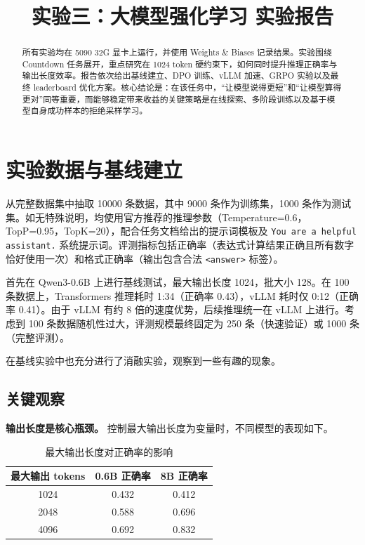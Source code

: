 \documentclass[UTF8,a4paper,10pt,twocolumn]{ctexart}
\title{\textbf{实验三：大模型强化学习 实验报告}}
\author{}
\date{}
\begin{document}
\maketitle

\begin{abstract}
所有实验均在 5090 32G 显卡上运行，并使用 Weights \& Biases 记录结果。实验围绕 Countdown 任务展开，重点研究在 1024 token 硬约束下，如何同时提升推理正确率与输出长度效率。报告依次给出基线建立、DPO 训练、vLLM 加速、GRPO 实验以及最终 leaderboard 优化方案。核心结论是：在该任务中，“让模型说得更短”和“让模型算得更对”同等重要，而能够稳定带来收益的关键策略是在线探索、多阶段训练以及基于模型自身成功样本的拒绝采样学习。
\end{abstract}

\section{实验数据与基线建立}

从完整数据集中抽取 10000 条数据，其中 9000 条作为训练集，1000 条作为测试集。如无特殊说明，均使用官方推荐的推理参数（Temperature=0.6，TopP=0.95，TopK=20），配合任务文档给出的提示词模板及 \texttt{You are a helpful assistant.} 系统提示词。评测指标包括正确率（表达式计算结果正确且所有数字恰好使用一次）和格式正确率（输出包含合法 \texttt{<answer>} 标签）。

首先在 Qwen3-0.6B 上进行基线测试，最大输出长度 1024，批大小 128。在 100 条数据上，Transformers 推理耗时 1:34（正确率 0.43），vLLM 耗时仅 0:12（正确率 0.41）。由于 vLLM 有约 8 倍的速度优势，后续推理统一在 vLLM 上进行。考虑到 100 条数据随机性过大，评测规模最终固定为 250 条（快速验证）或 1000 条（完整评测）。

在基线实验中也充分进行了消融实验，观察到一些有趣的现象。

\subsection{关键观察}

\textbf{输出长度是核心瓶颈。} 控制最大输出长度为变量时，不同模型的表现如下。

\begin{table}[H]
  \centering
  \caption{最大输出长度对正确率的影响}
  \begin{tabular}{ccc}
    \toprule
    最大输出 tokens & 0.6B 正确率 & 8B 正确率 \\
    \midrule
    1024 & 0.432 & 0.412 \\
    2048 & 0.588 & 0.696 \\
    4096 & 0.692 & 0.832 \\
    \bottomrule
  \end{tabular}
\end{table}
\end{document}
